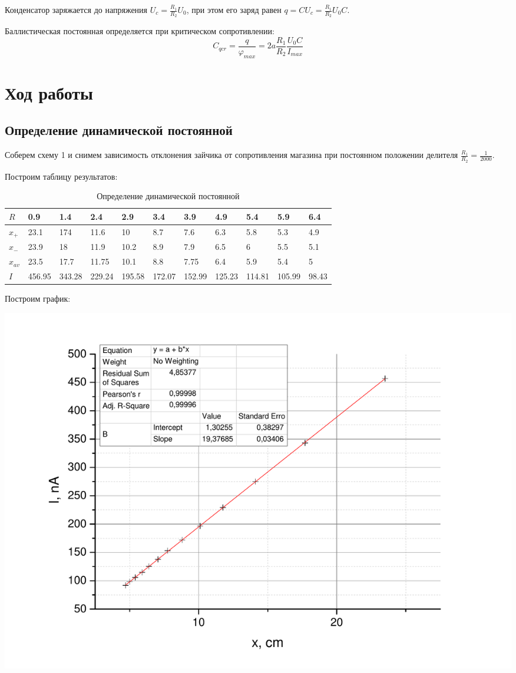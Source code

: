 \documentclass[a4paper,12pt]{article}
\begin{document}
	Конденсатор заряжается до напряжения $U_c = \frac{R_1}{R_2}U_0$, при этом его заряд равен $q = CU_c = \frac{R_1}{R_2}U_0C$.
	
	Баллистическая постоянная определяется при критическом сопротивлении:
\begin{equation}
	C_{q{cr}} = \frac{q}{\varphi_{max}} = 2a\frac{R_1}{R_2}\frac{U_0 C}{I_{max}}
\end{equation}

\section{Ход работы}
\subsection{Определение динамической постоянной}
Соберем схему 1 и снимем зависимость отклонения зайчика от сопротивления магазина при постоянном положении делителя $\frac{R_1}{R_2} = \frac{1}{2000}$.

Построим таблицу результатов:
\begin{table}[h]
	\caption{Определение динамической постоянной}
	\label{my-label}
	\begin{tabular}{|l|l|l|l|l|l|l|l|l|l|l|}
		\hline
		$R$     & 0.9    & 1.4       & 2.4    & 2.9    & 3.4    & 3.9      & 4.9    & 5.4    & 5.9   & 6.4     \\ \hline
		
		$x_+$   & 23.1   & 174     & 11.6   & 10     & 8.7    & 7.6         & 6.3    & 5.8    & 5.3   & 4.9     \\ \hline
		$x_-$   & 23.9   & 18       & 11.9   & 10.2   & 8.9    & 7.9       & 6.5    & 6      & 5.5   & 5.1     \\ \hline
		$x_{av}$& 23.5   & 17.7     & 11.75  & 10.1   & 8.8    & 7.75      & 6.4    & 5.9    & 5.4   & 5     \\ \hline
		$I$     & 456.95 & 343.28 & 229.24 & 195.58 & 172.07 & 152.99  & 125.23 & 114.81 & 105.99 & 98.43   \\ \hline
	\end{tabular}
\end{table}

\newpage
	Построим график:
	
	\includegraphics[width = 0.7\linewidth]{graph1}
	
\end{document}
